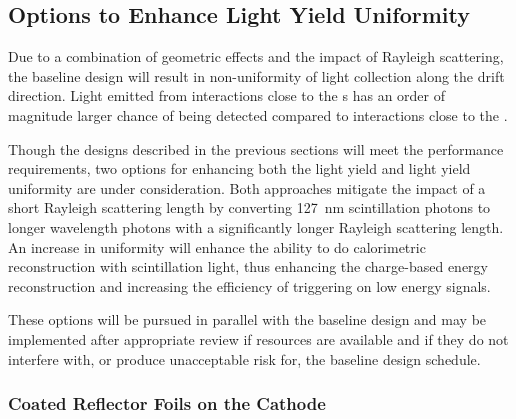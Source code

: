 
\subsection{Options to Enhance Light Yield Uniformity}
\label{sec:fdsp-pd-enh}

Due to a combination of geometric effects and the impact of Rayleigh scattering, the baseline   design will result in non-uniformity of light collection along the drift direction. Light emitted from interactions close to the s has an order of magnitude larger chance of being detected compared to interactions close to the .    

Though the designs described in the previous sections will meet the  performance requirements, %
two options for enhancing both the light yield and light yield uniformity are under consideration.  Both approaches mitigate the impact of a short Rayleigh scattering length by converting \SI{127}{nm} scintillation photons to longer wavelength photons with a significantly longer Rayleigh scattering length. %
An increase in uniformity %
will enhance the ability to do calorimetric reconstruction with scintillation light, %
thus enhancing the charge-based energy reconstruction %
and increasing the efficiency of triggering on low energy signals.

These options will be pursued in parallel with the baseline design and may be implemented after appropriate review if resources are available and if they do not interfere with, or produce unacceptable risk for, the baseline design schedule.



\subsubsection{Coated Reflector Foils on the  Cathode}
\label{sec:fdsp-pd-enh-cathode}

